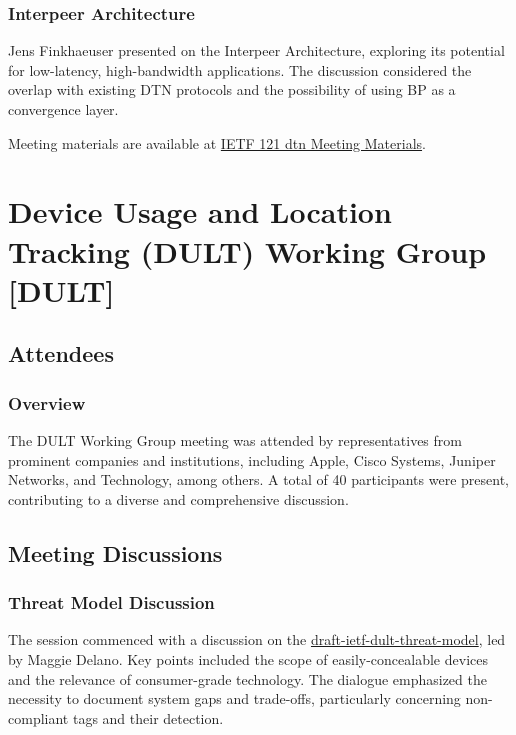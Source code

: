 \documentclass{article}
\begin{document}
\subsubsection{Interpeer Architecture}
Jens Finkhaeuser presented on the Interpeer Architecture, exploring its potential for low-latency, high-bandwidth applications. The discussion considered the overlap with existing DTN protocols and the possibility of using BP as a convergence layer.

Meeting materials are available at \href{https://www.ietf.org/proceedings/121/slides/slides-121-dtn-00.pdf}{IETF 121 dtn Meeting Materials}.



\newpage

\section{Device Usage and Location Tracking (DULT) Working Group [DULT]}

\subsection{Attendees}

\subsubsection{Overview}

The DULT Working Group meeting was attended by representatives from prominent companies and institutions, including Apple, Cisco Systems, Juniper Networks, and Technology, among others. A total of 40 participants were present, contributing to a diverse and comprehensive discussion.

\subsection{Meeting Discussions}

\subsubsection{Threat Model Discussion}

The session commenced with a discussion on the \href{https://datatracker.ietf.org/doc/html/draft-ietf-dult-threat-model}{draft-ietf-dult-threat-model}, led by Maggie Delano. Key points included the scope of easily-concealable devices and the relevance of consumer-grade technology. The dialogue emphasized the necessity to document system gaps and trade-offs, particularly concerning non-compliant tags and their detection.
\end{document}

